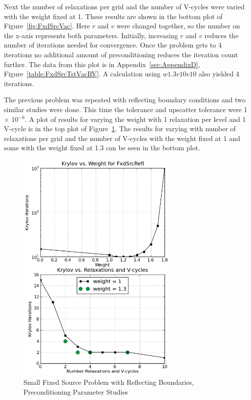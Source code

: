 Next the number of relaxations per grid and the number of V-cycles were varied with the weight fixed at 1. These results are shown in the bottom plot of Figure~\ref{fig:FxdSrcVac}. Here $r$ and $v$ were changed together, so the number on the x-axis represents both parameters. Initially, increasing $r$ and $v$ reduces the number of iterations needed for convergence. Once the problem gets to 4 iterations no additional amount of preconditioning reduces the iteration count further. The data from this plot is in Appendix~\ref{sec:AppendixD}, Figure~\ref{table:FxdSrcTstVacRV}. A calculation using $w1.3r10v10$ also yielded 4 iterations.

The previous problem was repeated with reflecting boundary conditions and two similar studies were done. This time the tolerance and upscatter tolerance were 1 $\times$ 10$^{-6}$. A plot of results for varying the weight with 1 relaxation per level and 1 V-cycle is in the top plot of Figure~\ref{fig:FxdSrcRefl}. The results for varying with number of relaxations per grid and the number of V-cycles with the weight fixed at 1 and some with the weight fixed at 1.3 can be seen in the bottom plot. 
%
\begin{figure}[!ht]
    \begin{center}
      \includegraphics [width=0.7\textwidth, height=0.8\textheight] {FxdSrcRefl}
   \end{center}
   \caption{Small Fixed Source Problem with Reflecting Boundaries, Preconditioning Parameter Studies}
   \label{fig:FxdSrcRefl}
\end{figure}

